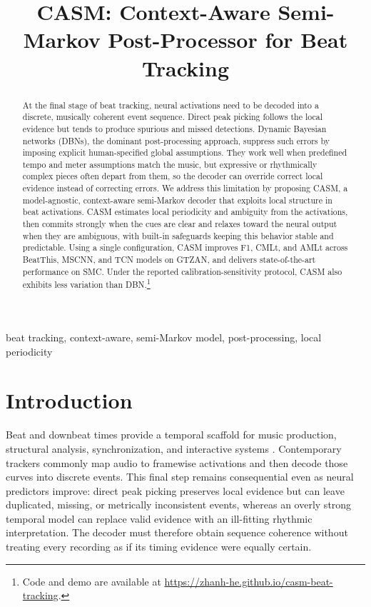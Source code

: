 \documentclass{article}
\title{CASM: Context-Aware Semi-Markov Post-Processor for Beat Tracking}
\begin{document}
\ninept
\maketitle

\begin{abstract}
At the final stage of beat tracking, neural activations need to be decoded into a discrete, musically coherent event sequence. Direct peak picking follows the local evidence but tends to produce spurious and missed detections. Dynamic Bayesian networks (DBNs), the dominant post-processing approach, suppress such errors by imposing explicit human-specified global assumptions. They work well when predefined tempo and meter assumptions match the music, but expressive or rhythmically complex pieces often depart from them, so the decoder can override correct local evidence instead of correcting errors. We address this limitation by proposing CASM, a model-agnostic, context-aware semi-Markov decoder that exploits local structure in beat activations. CASM estimates local periodicity and ambiguity from the activations, then commits strongly when the cues are clear and relaxes toward the neural output when they are ambiguous, with built-in safeguards keeping this behavior stable and predictable. Using a single configuration, CASM improves F1, CMLt, and AMLt across BeatThis, MSCNN, and TCN models on GTZAN, and delivers state-of-the-art performance on SMC. Under the reported calibration-sensitivity protocol, CASM also exhibits less variation than DBN.\footnote{Code and demo are available at \url{https://zhanh-he.github.io/casm-beat-tracking}.}
\end{abstract}

\begin{keywords}
beat tracking, context-aware, semi-Markov model, post-processing, local periodicity
\end{keywords}


\section{Introduction}
\label{sec:intro}
Beat and downbeat times provide a temporal scaffold for music production,
structural analysis, synchronization, and interactive systems
\cite{chiu2023localperiodicity,foscarin2024beat}. Contemporary trackers commonly
map audio to framewise activations and then decode those curves into discrete
events. This final step remains consequential even as neural predictors improve:
direct peak picking preserves local evidence but can leave duplicated, missing,
or metrically inconsistent events, whereas an overly strong temporal model can
replace valid evidence with an ill-fitting rhythmic interpretation. The decoder
must therefore obtain sequence coherence without treating every recording as if
its timing evidence were equally certain.
\end{document}

